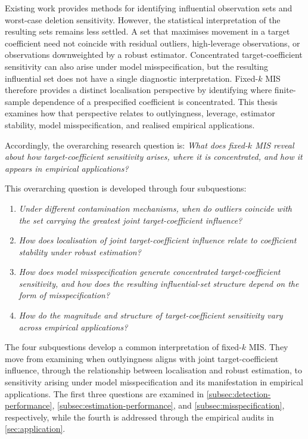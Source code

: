 \documentclass[../main.tex]{subfiles}
\begin{document}
Existing work provides methods for identifying influential observation sets and worst-case deletion sensitivity. However, the statistical interpretation of the resulting sets remains less settled. A set that maximises movement in a target coefficient need not coincide with residual outliers, high-leverage observations, or observations downweighted by a robust estimator. Concentrated target-coefficient sensitivity can also arise under model misspecification, but the resulting influential set does not have a single diagnostic interpretation. Fixed-\(k\) MIS therefore provides a distinct localisation perspective by identifying where finite-sample dependence of a prespecified coefficient is concentrated. This thesis examines how that perspective relates to outlyingness, leverage, estimator stability, model misspecification, and realised empirical applications.

Accordingly, the overarching research question is: \emph{What does fixed-\(k\) MIS reveal about how target-coefficient sensitivity arises, where it is concentrated, and how it appears in empirical applications?}

This overarching question is developed through four subquestions:

\begin{enumerate}
	\item \emph{Under different contamination mechanisms, when do outliers coincide with the set carrying the greatest joint target-coefficient influence?}
	
	\item \emph{How does localisation of joint target-coefficient influence relate to coefficient stability under robust estimation?}
	
	\item \emph{How does model misspecification generate concentrated target-coefficient sensitivity, and how does the resulting influential-set structure depend on the form of misspecification?}
	
	\item \emph{How do the magnitude and structure of target-coefficient sensitivity vary across empirical applications?}
\end{enumerate}

The four subquestions develop a common interpretation of fixed-\(k\) MIS. They move from examining when outlyingness aligns with joint target-coefficient influence, through the relationship between localisation and robust estimation, to sensitivity arising under model misspecification and its manifestation in empirical applications. The first three questions are examined in \autoref{subsec:detection-performance}, \autoref{subsec:estimation-performance}, and \autoref{subsec:misspecification}, respectively, while the fourth is addressed through the empirical audits in \autoref{sec:application}.
\end{document}
